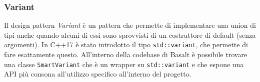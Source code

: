\subsubsection{Variant}
Il design pattern \textit{Variant} è un pattern che permette di implementare una union di tipi anche 
quando alcuni di essi sono sprovvisti di un costruttore di default (senza argomenti). In 
C++17 è stato introdotto il tipo \texttt{std::variant}, che permette di fare esattamente questo. All'interno 
della codebase di Basalt è possibile trovare una classe \texttt{SmartVariant} che è un wrapper su \texttt{std::variant}
e che espone una API più consona all'utilizzo specifico all'interno del progetto. \\
